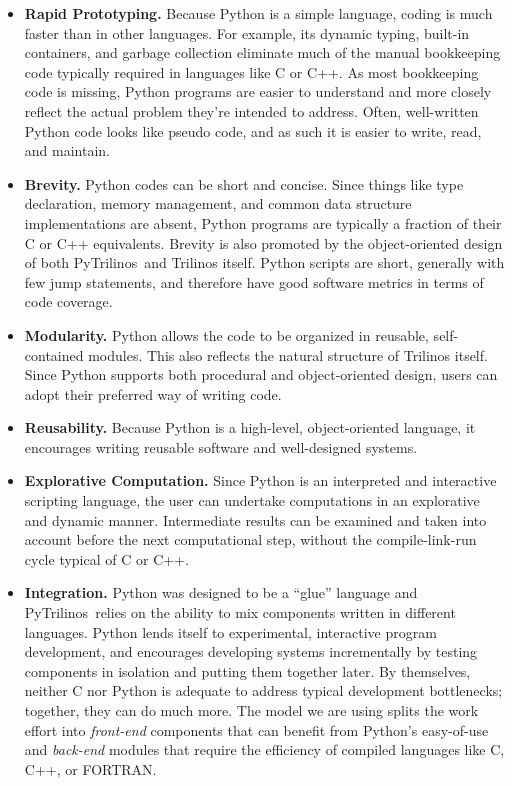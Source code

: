 \documentclass[acmtocl]{acmtrans2m}
\newcommand{\PyTrilinos}{{PyTrilinos}}
\begin{document}
\begin{itemize}

\item {\bf Rapid Prototyping.}  Because Python is a simple language,
  coding is much faster than in other languages.  For example, its
  dynamic typing, built-in containers, and garbage collection
  eliminate much of the manual bookkeeping code typically required in
  languages like C or C++.  As most bookkeeping code is missing,
  Python programs are easier to understand and more closely reflect
  the actual problem they're intended to address.  Often, well-written
  Python code looks like pseudo code, and as such it is easier to
  write, read, and maintain.

\item {\bf Brevity.} Python codes can be short and concise.  Since
  things like type declaration, memory management, and common data
  structure implementations are absent, Python programs are typically
  a fraction of their C or C++ equivalents.  Brevity is also promoted
  by the object-oriented design of both \PyTrilinos\ and Trilinos
  itself.  Python scripts are short, generally with few jump
  statements, and therefore have good software metrics in terms of
  code coverage.

\item {\bf Modularity.} Python allows the code to be organized in
  reusable, self-contained modules.  This also reflects the natural
  structure of Trilinos itself.  Since Python supports both procedural
  and object-oriented design, users can adopt their preferred way of
  writing code.

\item {\bf Reusability.} Because Python is a high-level,
  object-oriented language, it encourages writing reusable software
  and well-designed systems.

\item {\bf Explorative Computation.} Since Python is an interpreted
  and interactive scripting language, the user can undertake
  computations in an explorative and dynamic manner.  Intermediate
  results can be examined and taken into account before the next
  computational step, without the compile-link-run cycle typical of C
  or C++.

\item {\bf Integration.} Python was designed to be a ``glue'' language
  and \PyTrilinos\ relies on the ability to mix components written in
  different languages.  Python lends itself to experimental,
  interactive program development, and encourages developing systems
  incrementally by testing components in isolation and putting them
  together later.  By themselves, neither C nor Python is adequate to
  address typical development bottlenecks; together, they can do much
  more.  The model we are using splits the work effort into {\sl
    front-end} components that can benefit from Python's easy-of-use
  and {\sl back-end} modules that require the efficiency of compiled
  languages like C, C++, or FORTRAN.


\end{itemize}
\end{document}
